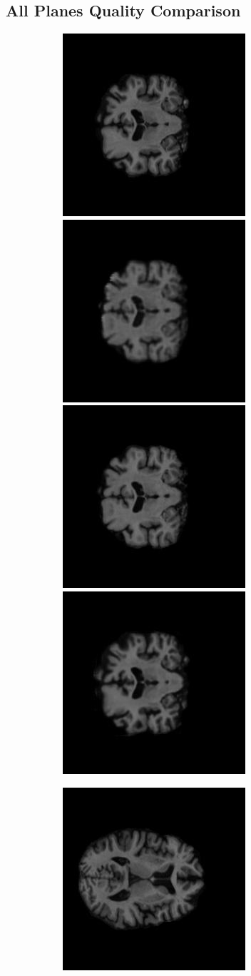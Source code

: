 \documentclass[11pt, fleqn, titlepage]{article}
\newcommand\skipperer{0.45pt}
\newcommand\ripperer{1.25pt}
\newcommand\bigskipx{2.1pt}
\newcommand{\1}[1]{\mathds{1}\left[#1\right]}
\begin{document}
\subsection{All Planes Quality Comparison}\label{all_generated}
\begin{figure}[H]
	\centering
	\begin{subfigure}[b]{0.7\textwidth}
		\centering
		\includegraphics[width=0.22\linewidth]{imgs/136_S_0196/136_S_0196_xy_3_GT}
		\hskip\skipperer
		\includegraphics[width=0.22\linewidth]{imgs/136_S_0196/ALL_model_xy_136_S_0196_1.5}
		\hskip\bigskipx
		\includegraphics[width=0.22\linewidth]{imgs/136_S_0196/136_S_0196_xy_1.5_GT}
		\hskip\skipperer
		\includegraphics[width=0.22\linewidth]{imgs/136_S_0196/ALL_model_136_S_0196_xy_3}
	\end{subfigure}
	\vskip\ripperer
	\begin{subfigure}[b]{0.7\textwidth}
		\centering
		\includegraphics[width=0.22\linewidth]{imgs/136_S_0196/136_S_0196_xz_3_GT}

\end{subfigure}
\end{figure}
\end{document}
